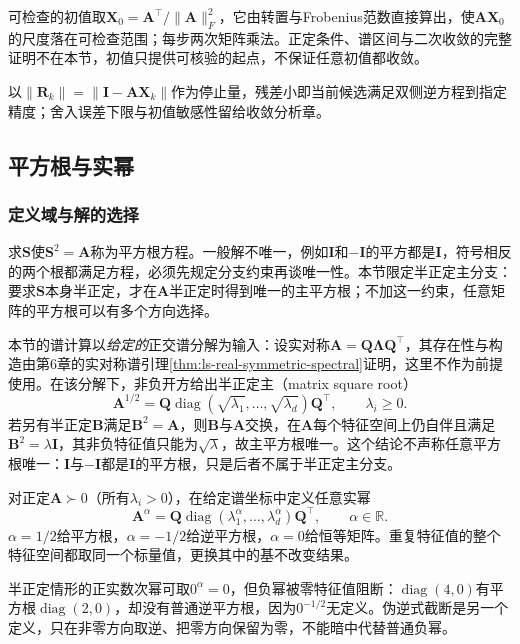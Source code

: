 可检查的初值取$\bm X_0=\bm A^\top/\lVert\bm A\rVert_F^2$，它由转置与Frobenius范数直接算出，使$\bm A\bm X_0$的尺度落在可检查范围；每步两次矩阵乘法。正定条件、谱区间与二次收敛的完整证明不在本节，初值只提供可核验的起点，不保证任意初值都收敛。

以$\lVert\bm R_k\rVert=\lVert\bm I-\bm A\bm X_k\rVert$作为停止量，残差小即当前候选满足双侧逆方程到指定精度；舍入误差下限与初值敏感性留给收敛分析章。

\subsection{平方根与实幂}

\subsubsection{定义域与解的选择}

求$\bm S$使$\bm S^2=\bm A$称为平方根方程。一般解不唯一，例如$\bm I$和$-\bm I$的平方都是$\bm I$，符号相反的两个根都满足方程，必须先规定分支约束再谈唯一性。本节限定半正定主分支：要求$\bm S$本身半正定，才在$\bm A$半正定时得到唯一的主平方根；不加这一约束，任意矩阵的平方根可以有多个方向选择。

本节的谱计算以\emph{给定的}正交谱分解为输入：设实对称$\bm A=\bm Q\bm\Lambda\bm Q^\top$，其存在性与构造由第6章的实对称谱引理\ref{thm:ls-real-symmetric-spectral}证明，这里不作为前提使用。在该分解下，非负开方给出半正定主（matrix square root）
\[
 \bm A^{1/2}=\bm Q\operatorname{diag}(\sqrt{\lambda_1},\ldots,\sqrt{\lambda_d})\bm Q^\top,
 \qquad \lambda_i\geq0.
\]
若另有半正定$\bm B$满足$\bm B^2=\bm A$，则$\bm B$与$\bm A$交换，在$\bm A$每个特征空间上仍自伴且满足$\bm B^2=\lambda\bm I$，其非负特征值只能为$\sqrt\lambda$，故主平方根唯一。这个结论不声称任意平方根唯一：$\bm I$与$-\bm I$都是$\bm I$的平方根，只是后者不属于半正定主分支。

对正定$\bm A\succ0$（所有$\lambda_i>0$），在给定谱坐标中定义任意实幂
\[
 \bm A^\alpha=\bm Q\operatorname{diag}(\lambda_1^\alpha,\ldots,\lambda_d^\alpha)\bm Q^\top,
 \qquad \alpha\in\mathbb R.
\]
$\alpha=1/2$给平方根，$\alpha=-1/2$给逆平方根，$\alpha=0$给恒等矩阵。重复特征值的整个特征空间都取同一个标量值，更换其中的基不改变结果。

半正定情形的正实数次幂可取$0^\alpha=0$，但负幂被零特征值阻断：$\operatorname{diag}(4,0)$有平方根$\operatorname{diag}(2,0)$，却没有普通逆平方根，因为$0^{-1/2}$无定义。伪逆式截断是另一个定义，只在非零方向取逆、把零方向保留为零，不能暗中代替普通负幂。

